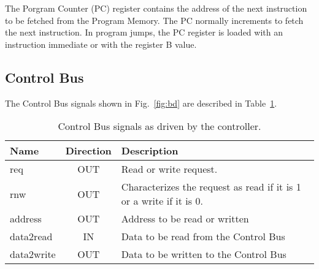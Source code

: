 The Porgram Counter (PC) register contains the address of the next instruction to be fetched from the
Program Memory. The PC normally increments to fetch the next
instruction. In program jumps, the PC register is loaded with an
instruction immediate or with the register B value.

\subsection{Control Bus}
\label{sec:rwbus}


The Control Bus signals shown in Fig.~\ref{fig:bd} are described
in Table~\ref{tab:rwbus}.

\begin{table}[!htbp]
  \centering
    \begin{tabular}{|p{1.8cm}|c|p{10cm}|}
    \hline 
    {\bf Name} & {\bf Direction} & {\bf Description} \\
    \hline \hline 
     req & OUT & Read or write request.\\
    \hline
     rnw & OUT & Characterizes the request as read if it is 1 or a write if it is 0. \\
    \hline
     address & OUT & Address to be read or written \\
    \hline
     data2read & IN & Data to be read from the Control Bus \\
    \hline
     data2write & OUT & Data to be written to the Control Bus \\
    \hline

    \end{tabular}
  \caption{Control Bus signals as driven by the controller.}
  \label{tab:rwbus}
\end{table}
